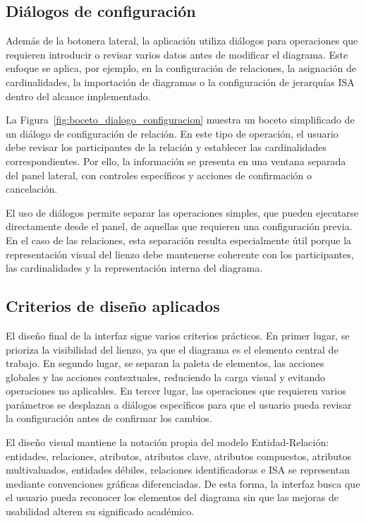 \subsection{Diálogos de configuración}

Además de la botonera lateral, la aplicación utiliza diálogos para operaciones que requieren introducir o revisar varios datos antes de modificar el diagrama. Este enfoque se aplica, por ejemplo, en la configuración de relaciones, la asignación de cardinalidades, la importación de diagramas o la configuración de jerarquías ISA dentro del alcance implementado.


La Figura~\ref{fig:boceto_dialogo_configuracion} muestra un boceto simplificado de un diálogo de configuración de relación. En este tipo de operación, el usuario debe revisar los participantes de la relación y establecer las cardinalidades correspondientes. Por ello, la información se presenta en una ventana separada del panel lateral, con controles específicos y acciones de confirmación o cancelación.

El uso de diálogos permite separar las operaciones simples, que pueden ejecutarse directamente desde el panel, de aquellas que requieren una configuración previa. En el caso de las relaciones, esta separación resulta especialmente útil porque la representación visual del lienzo debe mantenerse coherente con los participantes, las cardinalidades y la representación interna del diagrama.

\subsection{Criterios de diseño aplicados}

El diseño final de la interfaz sigue varios criterios prácticos. En primer lugar, se prioriza la visibilidad del lienzo, ya que el diagrama es el elemento central de trabajo. En segundo lugar, se separan la paleta de elementos, las acciones globales y las acciones contextuales, reduciendo la carga visual y evitando operaciones no aplicables. En tercer lugar, las operaciones que requieren varios parámetros se desplazan a diálogos específicos para que el usuario pueda revisar la configuración antes de confirmar los cambios.

El diseño visual mantiene la notación propia del modelo Entidad-Relación: entidades, relaciones, atributos, atributos clave, atributos compuestos, atributos multivaluados, entidades débiles, relaciones identificadoras e ISA se representan mediante convenciones gráficas diferenciadas. De esta forma, la interfaz busca que el usuario pueda reconocer los elementos del diagrama sin que las mejoras de usabilidad alteren su significado académico.

